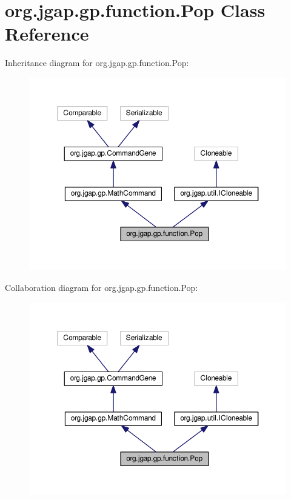 \hypertarget{classorg_1_1jgap_1_1gp_1_1function_1_1_pop}{\section{org.\-jgap.\-gp.\-function.\-Pop Class Reference}
\label{classorg_1_1jgap_1_1gp_1_1function_1_1_pop}
}


Inheritance diagram for org.\-jgap.\-gp.\-function.\-Pop\-:
\nopagebreak
\begin{figure}[H]
\begin{center}
\leavevmode
\includegraphics[width=350pt]{classorg_1_1jgap_1_1gp_1_1function_1_1_pop__inherit__graph}
\end{center}
\end{figure}


Collaboration diagram for org.\-jgap.\-gp.\-function.\-Pop\-:
\nopagebreak
\begin{figure}[H]
\begin{center}
\leavevmode
\includegraphics[width=350pt]{classorg_1_1jgap_1_1gp_1_1function_1_1_pop__coll__graph}
\end{center}
\end{figure}
